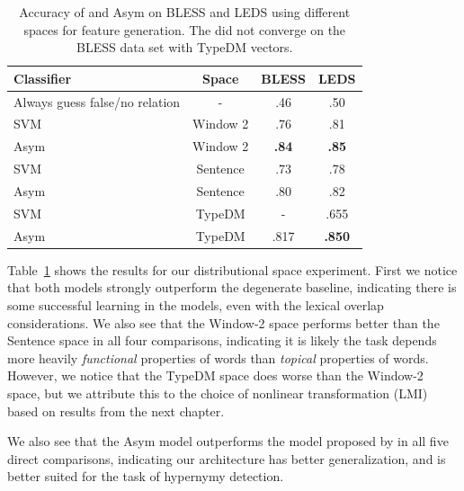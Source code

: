 \begin{table}
  \centering
  \begin{tabular}{|lc|cc|}
    \hline
    {\bf Classifier}                      &{\bf Space}& {\bf BLESS}  & {\bf LEDS} \\
    \hline
    \hline
    Always guess false/no relation        &   -       &      .46     &      .50   \\
    \hline
    SVM \cite{baroni:2012:eacl}           & Window 2  &      .76     &      .81   \\
    Asym \cite{roller:2014:coling}        & Window 2  & {\bf .84    }& {\bf .85}  \\
    \hline
    SVM                                   & Sentence  &      .73     &      .78   \\
    Asym                                  & Sentence  &      .80     &      .82   \\
    \hline
    SVM                                   & TypeDM    &        -     &      .655  \\
    Asym                                  & TypeDM    &      .817    & {\bf .850} \\
    \hline
  \end{tabular}
  \caption{Accuracy of  and Asym on BLESS and LEDS
    using different spaces for feature generation. The
     did not converge on the BLESS data set with
    TypeDM vectors.}
  \label{tab:asymspaces}
\end{table}

Table~\ref{tab:asymspaces} shows the results for our distributional space
experiment.  First we notice that both models strongly outperform the
degenerate baseline, indicating there is some successful learning in the
models, even with the lexical overlap considerations. We also see that the
Window-2 space performs better than the Sentence space in all four comparisons,
indicating it is likely the task depends more heavily {\em functional}
properties of words than {\em topical} properties of words. However, we notice
that the TypeDM space does worse than the Window-2 space, but we attribute this
to the choice of nonlinear transformation (LMI) based on results from the next
chapter.

We also see that the Asym model outperforms the model proposed by
 in all five direct comparisons, indicating our
architecture has better generalization, and is better suited for the task
of hypernymy detection.

